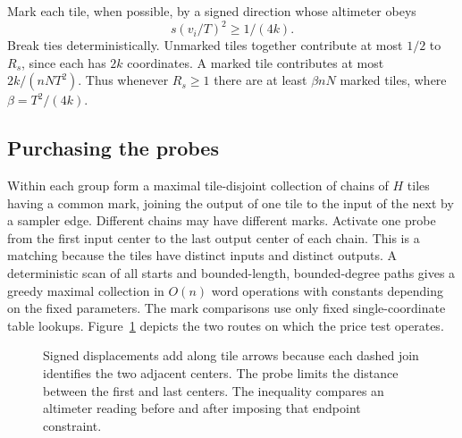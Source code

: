 Mark each tile, when possible, by a signed direction whose altimeter obeys
\[
                       s(v_i/T)^2\ge 1/(4k).
\]
Break ties deterministically. Unmarked tiles together contribute at most
\(1/2\) to \(R_s\), since each has \(2k\) coordinates. A marked tile contributes
at most \(2k/(nNT^2)\). Thus whenever \(R_s\ge1\) there are at least
\(\beta nN\) marked tiles, where \(\beta=T^2/(4k)\).

\subsection{Purchasing the probes}

Within each group form a maximal tile-disjoint collection of chains of
\(H\) tiles having a common mark, joining the output of one tile to the
input of the next by a sampler edge. Different chains may have different
marks. Activate one probe from the first input center to the last output
center of each chain. This is a matching because the tiles have distinct
inputs and distinct outputs. A deterministic scan of all starts and
bounded-length, bounded-degree paths gives a greedy maximal collection
in \(O(n)\) word operations with constants depending on the fixed
parameters. The mark comparisons use only fixed single-coordinate table
lookups. Figure~\ref{fig:marked-probe} depicts the two routes on which
the price test operates.
\begin{figure}[htbp]
\centering
{}
\caption{Signed displacements add along tile arrows because each dashed
join identifies the two adjacent centers. The probe limits the distance
between the first and last centers. The inequality compares an altimeter
reading before and after imposing that endpoint constraint.}
\label{fig:marked-probe}
\end{figure}

